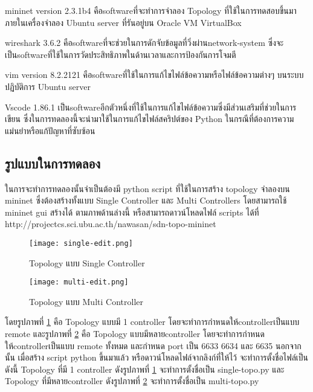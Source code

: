 mininet version 2.3.1b4
คือ\gls{software}ที่จะทำการจำลอง Topology ที่ใช้ในการทดสอบขึ้นมาภายในเครื่องจำลอง Ubuntu server ที่รันอยู่บน Oracle VM VirtualBox

wireshark 3.6.2
คือ\gls{software}ที่จะช่วยในการดักจับข้อมูลที่วิ่งผ่าน\gls{network-system} ซึ่งจะเป็น\gls{software}ที่ใช้ในการวัดประสิทธิภาพในด้านเวลาและการป้องกันการโจมตี

vim version 8.2.2121
คือ\gls{software}ที่ใช้ในการแก้ไขไฟล์ข้อความหรือไฟล์ข้อความต่างๆ บนระบบปฏิบัติการ Ubuntu server

Vscode 1.86.1
เป็น\gls{software}อีกตัวหนึ่งที่ใช้ในการแก้ไขไฟล์ข้อความซึ่งมีส่วนเสริมที่ช่วยในการเขียน ซึ่งในการทดลองนี้จะนำมาใช้ในการแก้ไขไฟล์สคริปต์ของ Python ในกรณีที่ต้องการความแม่นยำหรือแก้ปัญหาที่ซับซ้อน
\newline
\subsection{รูปแบบในการทดลอง}
\indent\indent
ในการจะทำการทดลองนั้นจำเป็นต้องมี python script ที่ใช้ในการสร้าง topology จำลองบน mininet
ซึ่งต้องสร้างทั้งแบบ Single Controller และ Multi Controllers โดยสามารถใช้ mininet gui สร้างได้ ตามภาพด้านล่างนี้
หรือสามารถดาวน์โหลดไฟล์ scripts ได้ที่ http://projectcs.sci.ubu.ac.th/nawasan/sdn-topo-mininet
\\

\begin{figure}[h!]
    \centering
    \texttt{[image: single-edit.png]}
    \caption{Topology แบบ Single Controller}
    \label{img:topo_cs}
\end{figure}

\begin{figure}[h!]
    \centering
    \texttt{[image: multi-edit.png]}
    \caption{Topology แบบ Multi Controller}
    \label{img:topo_cm}
\end{figure}

\pagebreak

โดยรูปภาพที่ \ref{img:topo_cs} คือ Topology แบบมี 1 \gls{controller} โดยจะทำการกำหนดให้\gls{controller}เป็นแบบ remote 
และรูปภาพที่ \ref{img:topo_cm} คือ Topology แบบมีหลาย\gls{controller} โดยจะทำการกำหนดให้\gls{controller}เป็นแบบ remote ทั้งหมด และกำหนด port เป็น 6633 6634 และ 6635
นอกจากนั้น เมื่อสร้าง script python ขึ้นมาแล้ว หรือดาวน์โหลดไฟล์จากลิงก์ที่ให้ไว้ จะทำการตั้งชื่อไฟล์เป็นดังนี้ Topology ที่มี 1 \gls{controller}
ดังรูปภาพที่ \ref{img:topo_cs} จะทำการตั้งชื่อเป็น single-topo.py และ Topology ที่มีหลาย\gls{controller} ดังรูปภาพที่ \ref{img:topo_cm} จะทำการตั้งชื่อเป็น multi-topo.py

